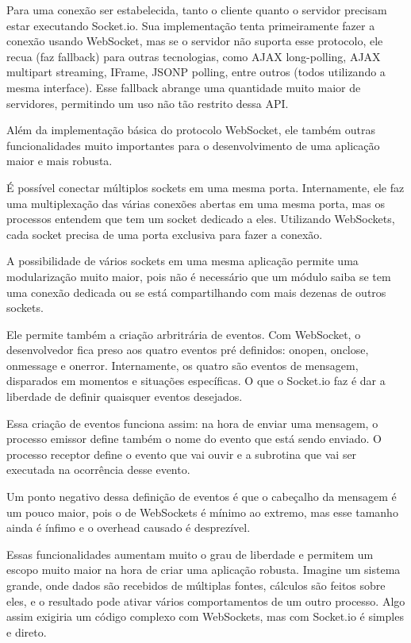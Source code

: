 \documentclass[a4paper,12pt]{article}
\begin{document}
Para uma conexão ser estabelecida, tanto o cliente quanto o servidor precisam estar executando Socket.io. Sua implementação tenta primeiramente fazer a conexão usando WebSocket, mas se o servidor não suporta esse protocolo, ele recua (faz fallback) para outras tecnologias, como AJAX long-polling, AJAX multipart streaming, IFrame, JSONP polling, entre outros (todos utilizando a mesma interface). Esse fallback abrange uma quantidade muito maior de servidores, permitindo um uso não tão restrito dessa API.

Além da implementação básica do protocolo WebSocket, ele também outras funcionalidades muito importantes para o desenvolvimento de uma aplicação maior e mais robusta.


É possível conectar múltiplos sockets em uma mesma porta. Internamente, ele faz uma multiplexação das várias conexões abertas em uma mesma porta, mas os processos entendem que tem um socket dedicado a eles. Utilizando WebSockets, cada socket precisa de uma porta exclusiva para fazer a conexão.

A possibilidade de vários sockets em uma mesma aplicação permite uma modularização muito maior, pois não é necessário que um módulo saiba se tem uma conexão dedicada ou se está compartilhando com mais dezenas de outros sockets.

Ele permite também a criação arbritrária de eventos. Com WebSocket, o desenvolvedor fica preso aos quatro eventos pré definidos: onopen, onclose, onmessage e onerror. Internamente, os quatro são eventos de mensagem, disparados em momentos e situações específicas. O que o Socket.io faz é dar a liberdade de definir quaisquer eventos desejados.

Essa criação de eventos funciona assim: na hora de enviar uma mensagem, o processo emissor define também o nome do evento que está sendo enviado. O processo receptor define o evento que vai ouvir e a subrotina que vai ser executada na ocorrência desse evento.

Um ponto negativo dessa definição de eventos é que o cabeçalho da mensagem é um pouco maior, pois o de WebSockets é mínimo ao extremo, mas esse tamanho ainda é ínfimo e o overhead causado é desprezível.

Essas funcionalidades aumentam muito o grau de liberdade e permitem um escopo muito maior na hora de criar uma aplicação robusta. Imagine um sistema grande, onde dados são recebidos de múltiplas fontes, cálculos são feitos sobre eles, e o resultado pode ativar vários comportamentos de um outro processo. Algo assim exigiria um código complexo com WebSockets, mas com Socket.io é simples e direto.
\end{document}
